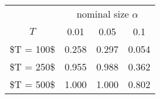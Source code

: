 % 
\begin{tabular}{cccc}
  \hline
  & \multicolumn{3}{c}{nominal size $\alpha$} \\
 $T$ & 0.01 & 0.05 & 0.1 \\
 \hline
\$T = 100\$ & 0.258 & 0.297 & 0.054 \\ 
  \$T = 250\$ & 0.955 & 0.988 & 0.362 \\ 
  \$T = 500\$ & 1.000 & 1.000 & 0.802 \\ 
   \hline
\end{tabular}
